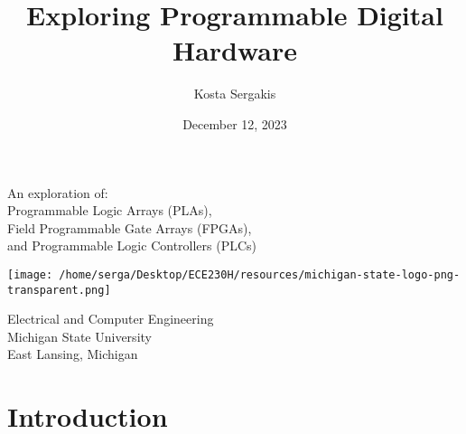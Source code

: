 \documentclass[12pt]{article}
\title{Exploring Programmable Digital Hardware}
\author{Kosta Sergakis}
\date{December 12, 2023}
\makeatletter
\let\runauthor\@author
\let\runtitle\@title
\let\rundate\@date
\makeatother
\begin{document}
    \begin{titlepage}
        \begin{center}
            \vspace*{1.5cm}
            
            \textbf{\runtitle}
            
            \vspace{1cm}
            
            An exploration of:\\
            Programmable Logic Arrays (PLAs),\\
            Field Programmable Gate Arrays (FPGAs),\\
            and Programmable Logic Controllers (PLCs)
                
            \vspace{1cm}
            
            \textbf{\runauthor}
            
            \vfill  
            
            
            \vspace{1cm}

            \texttt{[image: /home/serga/Desktop/ECE230H/resources/michigan-state-logo-png-transparent.png]}
                
            Electrical and Computer Engineering\\
            Michigan State University\\
            East Lansing, Michigan\\
            \rundate
                
        \end{center}
    \end{titlepage}
    
    \setcounter{secnumdepth}{0} %
    \tableofcontents
    \newpage

    \section{Introduction}
    
\end{document}
